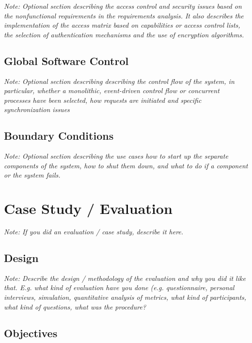 \documentclass[a4paper,12pt,twoside]{report}
\begin{document}
\textit{Note: Optional section describing the access control and security issues based on the nonfunctional requirements in the requirements analysis. It also describes the implementation of the access matrix based on capabilities or access control lists, the selection of  authentication mechanisms and the use of encryption algorithms.}

\section{Global Software Control}

\textit{Note: Optional section describing describing the control flow of the system, in particular, whether a monolithic, event-driven control flow or concurrent processes have been selected, how requests are initiated and specific synchronization issues}


\section{Boundary Conditions}

\textit{Note: Optional section describing the use cases how to start up the separate components of the system, how to shut them down, and what to do if a component or the system fails.}











\chapter{Case Study / Evaluation}

\textit{Note: If you did an evaluation / case study, describe it here.}

\section{Design}

\textit{Note: Describe the design / methodology of the evaluation and why you did it like that. E.g. what kind of evaluation have you done (e.g. questionnaire, personal interviews, simulation, quantitative analysis of metrics, what kind of participants, what kind of questions, what was the procedure?}

\section{Objectives}
\end{document}
